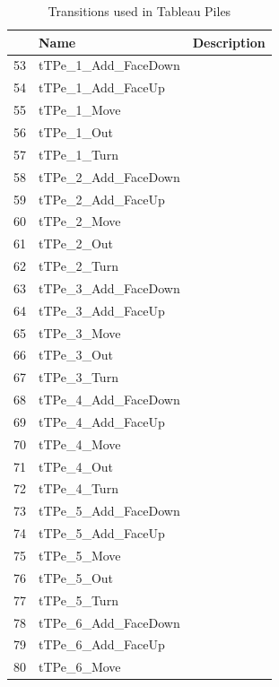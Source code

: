 \documentclass[runningheads,a4paper]{llncs}
\begin{document}
\begin{table}
	\caption{Transitions used in Tableau Piles}
	\begin{tabular}{|l|l|l|}
		\hline
		& Name & Description \\
		\hline
		53 & tTPe\_1\_Add\_FaceDown   &    \\ \hline
		54 & tTPe\_1\_Add\_FaceUp     &    \\ \hline
		55 & tTPe\_1\_Move            &    \\ \hline
		56 & tTPe\_1\_Out             &    \\ \hline
		57 & tTPe\_1\_Turn            &    \\ \hline
		58 & tTPe\_2\_Add\_FaceDown   &    \\ \hline
		59 & tTPe\_2\_Add\_FaceUp     &    \\ \hline
		60 & tTPe\_2\_Move            &    \\ \hline
		61 & tTPe\_2\_Out             &    \\ \hline
		62 & tTPe\_2\_Turn            &    \\ \hline
		63 & tTPe\_3\_Add\_FaceDown   &    \\ \hline
		64 & tTPe\_3\_Add\_FaceUp     &    \\ \hline
		65 & tTPe\_3\_Move            &    \\ \hline
		66 & tTPe\_3\_Out             &    \\ \hline
		67 & tTPe\_3\_Turn            &    \\ \hline
		68 & tTPe\_4\_Add\_FaceDown   &    \\ \hline
		69 & tTPe\_4\_Add\_FaceUp     &    \\ \hline
		70 & tTPe\_4\_Move            &    \\ \hline
		71 & tTPe\_4\_Out             &    \\ \hline
		72 & tTPe\_4\_Turn            &    \\ \hline
		73 & tTPe\_5\_Add\_FaceDown   &    \\ \hline
		74 & tTPe\_5\_Add\_FaceUp     &    \\ \hline
		75 & tTPe\_5\_Move            &    \\ \hline
		76 & tTPe\_5\_Out             &    \\ \hline
		77 & tTPe\_5\_Turn            &    \\ \hline
		78 & tTPe\_6\_Add\_FaceDown   &    \\ \hline
		79 & tTPe\_6\_Add\_FaceUp     &    \\ \hline
		80 & tTPe\_6\_Move            &    \\ \hline

\end{tabular}
\end{table}
\end{document}
